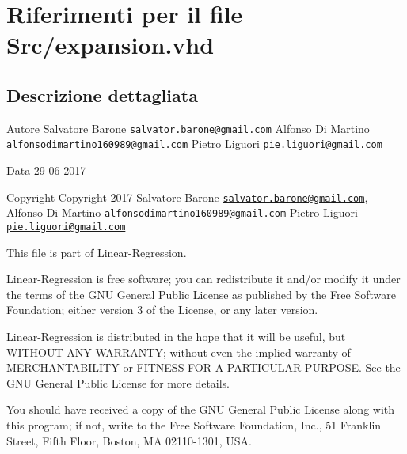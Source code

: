 \hypertarget{expansion_8vhd}{\section{Riferimenti per il file Src/expansion.vhd}
\label{expansion_8vhd}
}


\subsection{Descrizione dettagliata}
\begin{DoxyAuthor}{Autore}
Salvatore Barone \href{mailto:salvator.barone@gmail.com}{\tt salvator.\+barone@gmail.\+com} Alfonso Di Martino \href{mailto:alfonsodimartino160989@gmail.com}{\tt alfonsodimartino160989@gmail.\+com} Pietro Liguori \href{mailto:pie.liguori@gmail.com}{\tt pie.\+liguori@gmail.\+com}
\end{DoxyAuthor}
\begin{DoxyDate}{Data}
29 06 2017
\end{DoxyDate}
\begin{DoxyCopyright}{Copyright}
Copyright 2017 Salvatore Barone \href{mailto:salvator.barone@gmail.com}{\tt salvator.\+barone@gmail.\+com}, Alfonso Di Martino \href{mailto:alfonsodimartino160989@gmail.com}{\tt alfonsodimartino160989@gmail.\+com} Pietro Liguori \href{mailto:pie.liguori@gmail.com}{\tt pie.\+liguori@gmail.\+com}
\end{DoxyCopyright}
This file is part of Linear-\/\+Regression.

Linear-\/\+Regression is free software; you can redistribute it and/or modify it under the terms of the G\+N\+U General Public License as published by the Free Software Foundation; either version 3 of the License, or any later version.

Linear-\/\+Regression is distributed in the hope that it will be useful, but W\+I\+T\+H\+O\+U\+T A\+N\+Y W\+A\+R\+R\+A\+N\+T\+Y; without even the implied warranty of M\+E\+R\+C\+H\+A\+N\+T\+A\+B\+I\+L\+I\+T\+Y or F\+I\+T\+N\+E\+S\+S F\+O\+R A P\+A\+R\+T\+I\+C\+U\+L\+A\+R P\+U\+R\+P\+O\+S\+E. See the G\+N\+U General Public License for more details.

You should have received a copy of the G\+N\+U General Public License along with this program; if not, write to the Free Software Foundation, Inc., 51 Franklin Street, Fifth Floor, Boston, M\+A 02110-\/1301, U\+S\+A. 